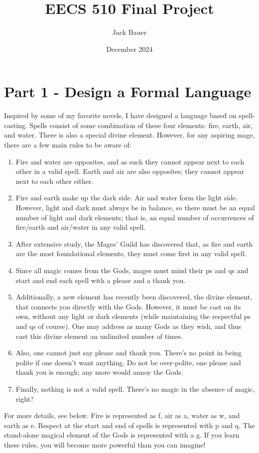 \documentclass{article}
\title{EECS 510 Final Project}
\author{Jack Bauer}
\date{December 2024}
\begin{document}
\maketitle
\section{Part 1 - Design a Formal Language}
Inspired by some of my favorite novels, I have designed a language based on spell-casting. Spells consist of some combination of these four elements: fire, earth, air, and water. There is also a special divine element. However, for any aspiring mage, there are a few main rules to be aware of:
\begin{enumerate}
    \item 
    Fire and water are opposites, and as such they cannot appear next to each other in a valid spell. Earth and air are also opposites; they cannot appear next to each other either. 
    \item 
    Fire and earth make up the dark side. Air and water form the light side. However, light and dark must always be in balance, so there must be an equal number of light and dark elements; that is, an equal number of occurrences of fire/earth and air/water in any valid spell.
    \item 
    After extensive study, the Mages' Guild has discovered that, as fire and earth are the most foundational elements, they must come first in any valid spell.
    \item Since all magic comes from the Gods, mages must mind their ps and qs and start and end each spell with a please and a thank you. 
    \item Additionally, a new element has recently been discovered, the divine element, that connects you directly with the Gods. However, it must be cast on its own, without any light or dark elements (while maintaining the respectful ps and qs of course). One may address as many Gods as they wish, and thus cast this divine element an unlimited number of times. 
    \item Also, one cannot just say please and thank you. There's no point in being polite if one doesn't want anything. Do not be over-polite, one please and thank you is enough; any more would annoy the Gods. 
    \item
    Finally, nothing is not a valid spell. There's no magic in the absence of magic, right? 
\end{enumerate}
For more details, see below. Fire is represented as f, air as a, water as w, and earth as e. Respect at the start and end of spells is represented with p and q. The stand-alone magical element of the Gods is represented with a g. If you learn these rules, you will become more powerful than you can imagine!
\end{document}
